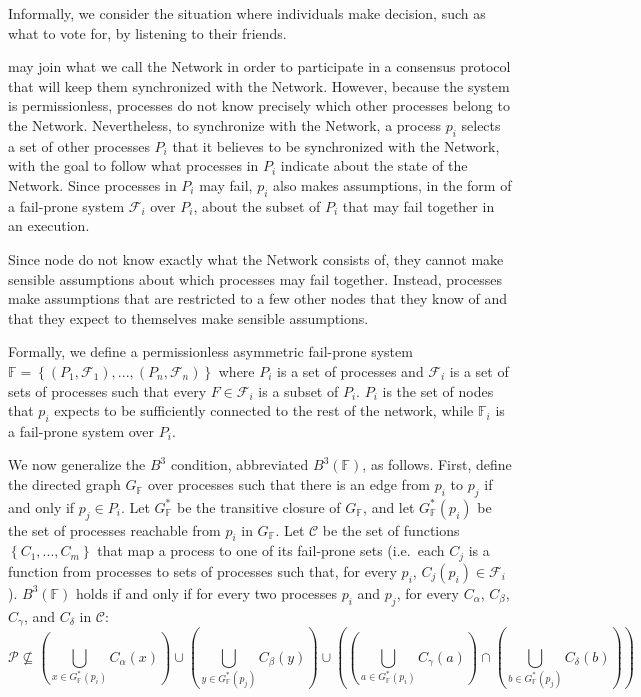 \documentclass[11pt]{article}
\begin{document}
Informally, we consider the situation where individuals make decision, such as what to vote for, by listening to their friends.

may join what we call the Network in order to participate in a consensus protocol that will keep them synchronized with the Network. However, because the system is permissionless, processes do not know precisely which other processes belong to the Network. Nevertheless, to synchronize with the Network, a process $p_i$ selects a set of other processes $P_i$ that it believes to be synchronized with the Network, with the goal to follow what processes in $P_i$ indicate about the state of the Network. Since processes in $P_i$ may fail, $p_i$ also makes assumptions, in the form of a fail-prone system $\mathcal{F}_i$ over $P_i$, about the subset of $P_i$ that may fail together in an execution.


Since node do not know exactly what the Network consists of, they cannot make sensible assumptions about which processes may fail together. Instead, processes make assumptions that are restricted to a few other nodes that they know of and that they expect to themselves make sensible assumptions.

Formally, we define a permissionless asymmetric fail-prone system $\mathbb{F}=\left\{\left(P_1,\mathcal{F}_1\right),...,\left(P_n,\mathcal{F}_n\right)\right\}$ where $P_i$ is a set of processes and $\mathcal{F}_i$ is a set of sets of processes such that every $F\in\mathcal{F}_i$ is a subset of $P_i$. $P_i$ is the set of nodes that $p_i$ expects to be sufficiently connected to the rest of the network, while $\mathbb{F}_i$ is a fail-prone system over $P_i$.

  We now generalize the $B^3$ condition, abbreviated $B^3(\mathbb{F})$, as follows. First, define the directed graph $G_\mathbb{F}$ over processes such that there is an edge from $p_i$ to $p_j$ if and only if $p_j\in P_i$. Let $G_\mathbb{F}^*$ be the transitive closure of $G_\mathbb{F}$, and let $G_\mathbb{F}^*(p_i)$ be the set of processes reachable from $p_i$ in $G_\mathbb{F}$. Let $\mathcal{C}$ be the set of functions $\left\{C_1,...,C_m\right\}$ that map a process to one of its fail-prone sets (i.e.\ each $C_j$ is a function from processes to sets of processes such that, for every $p_i$, $C_j(p_i)\in \mathcal{F}_i$).
  $B^3(\mathbb{F})$ holds if and only if for every two processes $p_i$ and $p_j$, for every $C_\alpha$, $C_\beta$, $C_\gamma$, and $C_\delta$ in $\mathcal{C}$:
  \begin{equation}
    \mathcal{P}\not\subseteq \left(\bigcup_{x \in G_\mathbb{F}^*(p_i)}C_\alpha(x)\right) \cup \left(\bigcup_{y \in G_\mathbb{F}^*(p_j)}C_\beta(y)\right) \cup \left(\left(\bigcup_{a \in G_\mathbb{F}^*(p_i)}C_\gamma(a)\right) \cap \left(\bigcup_{b \in G_\mathbb{F}^*(p_j)}C_\delta(b)\right) \right)
  \end{equation}
\end{document}
